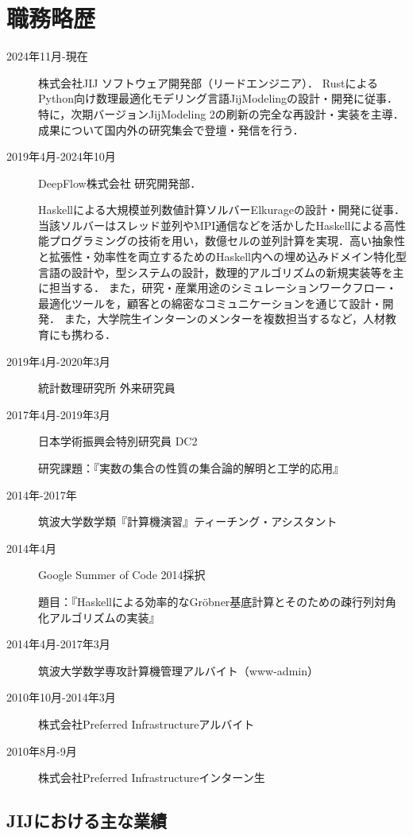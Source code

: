 \documentclass[a4j]{ltjsarticle}
\begin{document}
\section*{職務略歴}
\begin{refsection}
  \newrefcontext[labelprefix={J-}] 
\begin{description}
 \item[2024年11月-現在] 株式会社JIJ ソフトウェア開発部（リードエンジニア）．
  RustによるPython向け数理最適化モデリング言語JijModelingの設計・開発に従事．
  特に，次期バージョンJijModeling 2の刷新の完全な再設計・実装を主導．成果について国内外の研究集会で登壇・発信を行う．

 \item[2019年4月-2024年10月] DeepFlow株式会社 研究開発部．
 
  Haskellによる大規模並列数値計算ソルバーElkurageの設計・開発に従事．当該ソルバーはスレッド並列やMPI通信などを活かしたHaskellによる高性能プログラミングの技術を用い，数億セルの並列計算を実現．高い抽象性と拡張性・効率性を両立するためのHaskell内への埋め込みドメイン特化型言語の設計や，型システムの設計，数理的アルゴリズムの新規実装等を主に担当する．
  また，研究・産業用途のシミュレーションワークフロー・最適化ツールを，顧客との綿密なコミュニケーションを通じて設計・開発．
  また，大学院生インターンのメンターを複数担当するなど，人材教育にも携わる．

 \item[2019年4月-2020年3月] 統計数理研究所 外来研究員
 \item[2017年4月-2019年3月]
              日本学術振興会特別研究員 DC2

              研究課題：『実数の集合の性質の集合論的解明と工学的応用』
 \item[2014年-2017年] 筑波大学数学類『計算機演習』ティーチング・アシスタント
 \item[2014年4月] Google Summer of Code 2014採択

            題目：『Haskellによる効率的なGr\"{o}bner基底計算とそのための疎行列対角化アルゴリズムの実装』
 \item[2014年4月-2017年3月] 筑波大学数学専攻計算機管理アルバイト（www-admin）
 \item[2010年10月-2014年3月] 株式会社Preferred Infrastructureアルバイト
 \item[2010年8月-9月] 株式会社Preferred Infrastructureインターン生
\end{description}

\subsection*{JIJにおける主な業績}


\end{refsection}
\end{document}
